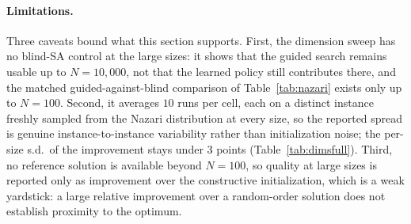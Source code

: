 \documentclass[letterpaper]{article} %
\begin{document}
\paragraph{Limitations.}
Three caveats bound what this section supports. First, the dimension sweep has no blind-SA control at the large sizes: it shows that the guided search remains usable up to $N = 10{,}000$, not that the learned policy still contributes there, and the matched guided-against-blind comparison of Table~\ref{tab:nazari} exists only up to $N = 100$. Second, it averages $10$ runs per cell, each on a distinct instance freshly sampled from the Nazari distribution at every size, so the reported spread is genuine instance-to-instance variability rather than initialization noise; the per-size s.d.\ of the improvement stays under $3$ points (Table~\ref{tab:dimsfull}). Third, no reference solution is available beyond $N = 100$, so quality at large sizes is reported only as improvement over the constructive initialization, which is a weak yardstick: a large relative improvement over a random-order solution does not establish proximity to the optimum.
\end{document}

